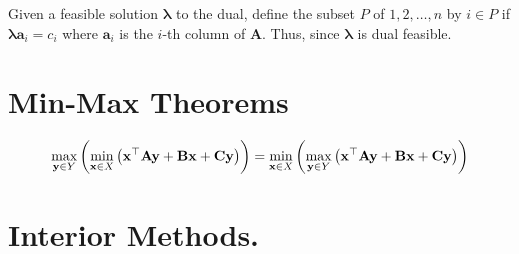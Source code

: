 Given a feasible solution $\pmb{\lambda}$ to the dual, define the subset $P$ of $1,2,\dots, n$ by $i\in P$ if $\pmb{\lambda}\mathbf{a}_i=c_i$ where $\mathbf{a}_i$ is the $i$-th column of $\mathbf{A}$. Thus, since $\pmb{\lambda}$ is dual feasible.

\section{Min-Max Theorems}

\begin{equation}
\max_{\mathbf y\in Y}\left( \min_{\mathbf x \in X}	\left( \mathbf{x}^\top\mathbf{A}\mathbf{y}+\mathbf{B}\mathbf{x} +\mathbf{C}\mathbf{y} \right) \right) =\min_{\mathbf x\in X}\left( \max_{\mathbf y \in Y}	\left( \mathbf{x}^\top\mathbf{A}\mathbf{y}+\mathbf{B}\mathbf{x} +\mathbf{C}\mathbf{y} \right) \right)
\end{equation}

\section{Interior Methods.}

